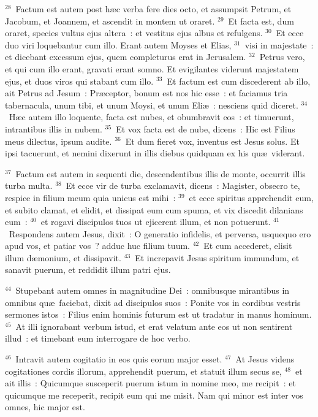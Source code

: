 ${}^{28}$~Factum est autem post h\ae c verba fere dies octo, et assumpsit Petrum, et Jacobum, et Joannem, et ascendit in montem ut oraret.
${}^{29}$~Et facta est, dum oraret, species vultus ejus altera~: et vestitus ejus albus et refulgens.
${}^{30}$~Et ecce duo viri loquebantur cum illo. Erant autem Moyses et Elias,
${}^{31}$~visi in majestate~: et dicebant excessum ejus, quem completurus erat in Jerusalem.
${}^{32}$~Petrus vero, et qui cum illo erant, gravati erant somno. Et evigilantes viderunt majestatem ejus, et duos viros qui stabant cum illo.
${}^{33}$~Et factum est cum discederent ab illo, ait Petrus ad Jesum~: Pr\ae ceptor, bonum est nos hic esse~: et faciamus tria tabernacula, unum tibi, et unum Moysi, et unum Eli\ae~: nesciens quid diceret.
${}^{34}$~H\ae c autem illo loquente, facta est nubes, et obumbravit eos~: et timuerunt, intrantibus illis in nubem.
${}^{35}$~Et vox facta est de nube, dicens~: Hic est Filius meus dilectus, ipsum audite.
${}^{36}$~Et dum fieret vox, inventus est Jesus solus. Et ipsi tacuerunt, et nemini dixerunt in illis diebus quidquam ex his qu\ae\ viderant.


${}^{37}$~Factum est autem in sequenti die, descendentibus illis de monte, occurrit illis turba multa.
${}^{38}$~Et ecce vir de turba exclamavit, dicens~: Magister, obsecro te, respice in filium meum quia unicus est mihi~:
${}^{39}$~et ecce spiritus apprehendit eum, et subito clamat, et elidit, et dissipat eum cum spuma, et vix discedit dilanians eum~:
${}^{40}$~et rogavi discipulos tuos ut ejicerent illum, et non potuerunt.
${}^{41}$~Respondens autem Jesus, dixit~: O generatio infidelis, et perversa, usquequo ero apud vos, et patiar vos~? adduc huc filium tuum.
${}^{42}$~Et cum accederet, elisit illum d\ae monium, et dissipavit.
${}^{43}$~Et increpavit Jesus spiritum immundum, et sanavit puerum, et reddidit illum patri ejus.


${}^{44}$~Stupebant autem omnes in magnitudine Dei~: omnibusque mirantibus in omnibus qu\ae\ faciebat, dixit ad discipulos suos~: Ponite vos in cordibus vestris sermones istos~: Filius enim hominis futurum est ut tradatur in manus hominum.
${}^{45}$~At illi ignorabant verbum istud, et erat velatum ante eos ut non sentirent illud~: et timebant eum interrogare de hoc verbo.


${}^{46}$~Intravit autem cogitatio in eos quis eorum major esset.
${}^{47}$~At Jesus videns cogitationes cordis illorum, apprehendit puerum, et statuit illum secus se,
${}^{48}$~et ait illis~: Quicumque susceperit puerum istum in nomine meo, me recipit~: et quicumque me receperit, recipit eum qui me misit. Nam qui minor est inter vos omnes, hic major est.


